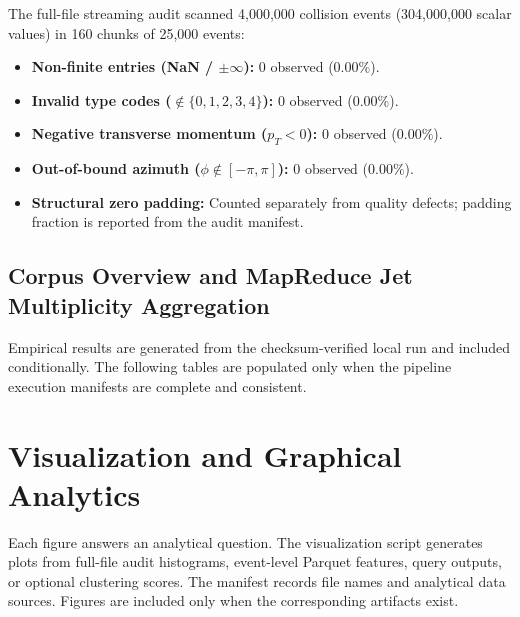 \documentclass[11pt,a4paper]{article}
\begin{document}
The full-file streaming audit scanned 4,000,000 collision events (304,000,000 scalar values) in 160 chunks of 25,000 events:
\begin{itemize}
    \item \textbf{Non-finite entries (NaN / $\pm\infty$):} $0$ observed ($0.00\%$).
    \item \textbf{Invalid type codes ($\notin \{0,1,2,3,4\}$):} $0$ observed ($0.00\%$).
    \item \textbf{Negative transverse momentum ($p_T < 0$):} $0$ observed ($0.00\%$).
    \item \textbf{Out-of-bound azimuth ($\phi \notin [-\pi, \pi]$):} $0$ observed ($0.00\%$).
    \item \textbf{Structural zero padding:} Counted separately from quality defects; padding fraction is reported from the audit manifest.
\end{itemize}

\subsection{Corpus Overview and MapReduce Jet Multiplicity Aggregation}

Empirical results are generated from the checksum-verified local run and included conditionally. The following tables are populated only when the pipeline execution manifests are complete and consistent.


\section{Visualization and Graphical Analytics}

Each figure answers an analytical question. The visualization script generates plots from full-file audit histograms, event-level Parquet features, query outputs, or optional clustering scores. The manifest records file names and analytical data sources. Figures are included only when the corresponding artifacts exist.
\end{document}
